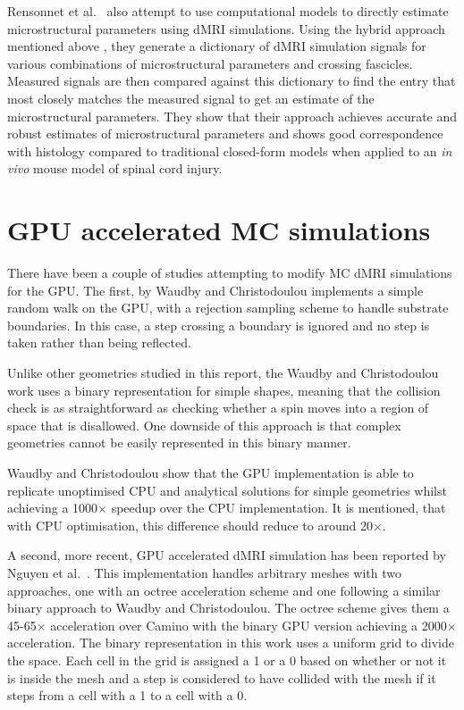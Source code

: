 Rensonnet et al.\ \cite{Rensonnet2018} also attempt to use computational models to directly estimate microstructural parameters using \ac{dMRI} simulations.
Using the hybrid approach mentioned above \cite{Rensonnet2015}, they generate a dictionary of \ac{dMRI} simulation signals for various combinations of microstructural parameters and crossing fascicles.
Measured signals are then compared against this dictionary to find the entry that most closely matches the measured signal to get an estimate of the microstructural parameters.
They show that their approach achieves accurate and robust estimates of microstructural parameters and shows good correspondence with histology compared to traditional closed-form models when applied to an \emph{in vivo} mouse model of spinal cord injury. 



\section{\ac{GPU} accelerated \ac{MC} simulations}
\label{sec:review_gpu}
There have been a couple of studies attempting to modify \ac{MC} \ac{dMRI} simulations for the \ac{GPU}.
The first, by Waudby and Christodoulou \cite{Waudby2011} implements a simple random walk on the \ac{GPU}, with a rejection sampling scheme to handle substrate boundaries.
In this case, a step crossing a boundary is ignored and no step is taken rather than being reflected.

Unlike other geometries studied in this report, the Waudby and Christodoulou work uses a binary representation for simple shapes, meaning that the collision check is as straightforward as checking whether a spin moves into a region of space that is disallowed.
One downside of this approach is that complex geometries cannot be easily represented in this binary manner.

Waudby and Christodoulou show that the \ac{GPU} implementation is able to replicate unoptimised \ac{CPU} and analytical solutions for simple geometries whilst achieving a 1000$\times$ speedup over the \ac{CPU} implementation.
It is mentioned, that with \ac{CPU} optimisation, this difference should reduce to around 20$\times$.

A second, more recent, \ac{GPU} accelerated \ac{dMRI} simulation has been reported by Nguyen et al.\ \cite{Nguyen2018}.
This implementation handles arbitrary meshes with two approaches, one with an octree acceleration scheme and one following a similar binary approach to Waudby and Christodoulou.
The octree scheme gives them a 45-65$\times$ acceleration over Camino with the binary \ac{GPU} version achieving a 2000$\times$ acceleration.
The binary representation in this work uses a uniform grid to divide the space.
Each cell in the grid is assigned a 1 or a 0 based on whether or not it is inside the mesh and a step is considered to have collided with the mesh if it steps from a cell with a 1 to a cell with a 0.

